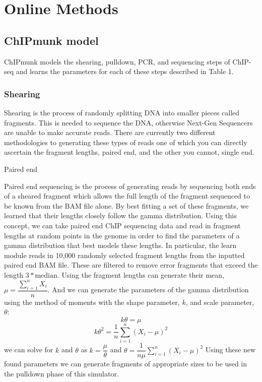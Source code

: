\documentclass[12pt]{article}
\begin{document}
\section*{Online Methods}

\subsection*{ChIPmunk model}

ChIPmunk models the shearing, pulldown, PCR, and sequencing steps of ChIP-seq and learns the parameters for each of these steps described in Table 1. 

\subsubsection*{Shearing}

Shearing is the process of randomly splitting DNA into smaller pieces called fragments. This is needed to sequence the DNA, otherwise Next-Gen Sequencers are unable to make accurate reads. There are currently two different methodologies to generating these types of reads one of which you can directly ascertain the fragment lengths, paired end, and the other you cannot, single end.

Paired end

Paired end sequencing is the process of generating reads by sequencing both ends of a sheared fragment which allows the full length of the fragment sequenced to be known from the BAM file alone. By best fitting a set of these fragments, we learned that their lengths closely follow the gamma distribution. Using this concept, we can take paired end ChIP sequencing data and read in fragment lengths at random points in the genome in order to find the parameters of a gamma distribution that best models these lengths. In particular, the learn module reads in 10,000 randomly selected fragment lengths from the inputted paired end BAM file. These are filtered to remove error fragments that exceed the length $3 * \text{median}$. Using the fragment lengths can generate their mean, $\mu = \dfrac{\sum_{i=1}^{n}X_i}{n}$. And we can generate the parameters of the gamma distribution using the method of moments with the shape parameter, $k$, and scale parameter, $\theta$: 
$$k\theta = \mu$$
$$k{\theta}^2 = \dfrac{1}{n}\sum_{i=1}^n(X_i - \mu)^2$$  
we can solve for $k$ and $\theta$ as $k = \dfrac{\mu}{\theta}$ and $\theta = \dfrac{1}{n\mu}\sum_{i=1}^{n}(X_i - \mu)^2$
Using these new found parameters we can generate fragments of appropriate sizes to be used in the pulldown phase of this simulator.
\end{document}
